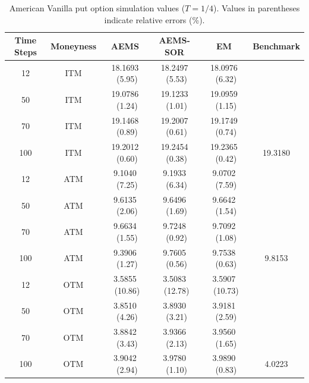 \documentclass[graybox]{svmult}
\begin{document}
\begin{table}[H]
\centering
\caption{American Vanilla put option simulation values ($T=1/4$). Values in parentheses indicate relative errors (\%).}
\label{tab:ThreeMonthsVanilla}
\setlength{\tabcolsep}{3.4pt} 
\begin{tabular}{c c c c c c}
\toprule
\textbf{Time Steps} & \textbf{Moneyness} & \textbf{AEMS} & \textbf{AEMS-SOR} & \textbf{EM} & \textbf{Benchmark} \\ 
\midrule
12  & ITM & 18.1693 \ (5.95) & 18.2497 \ (5.53) & 18.0976 \ (6.32) &  \\
50  & ITM & 19.0786 \ (1.24) & 19.1233 \ (1.01) & 19.0959 \ (1.15) \\
70  & ITM & 19.1468 \ (0.89) & 19.2007 \ (0.61) & 19.1749 \ (0.74) \\
100 & ITM & 19.2012 \ (0.60) & 19.2454 \ (0.38) & 19.2365 \ (0.42) & 19.3180 \\
\midrule
12  & ATM & \phantom{1}9.1040 \ (7.25) & \phantom{1}9.1933 \ (6.34) & \phantom{1}9.0702 \ (7.59) &  \\
50  & ATM & \phantom{1}9.6135 \ (2.06) & \phantom{1}9.6496 \ (1.69) & \phantom{1}9.6642 \ (1.54) \\
70  & ATM & \phantom{1}9.6634 \ (1.55) & \phantom{1}9.7248 \ (0.92) & \phantom{1}9.7092 \ (1.08) \\
100 & ATM & \phantom{1}9.3906 \ (1.27) & \phantom{1}9.7605 \ (0.56) & \phantom{1}9.7538 \ (0.63) & \phantom{1}9.8153 \\
\midrule
12  & OTM & \phantom{1}3.5855 \ (10.86) & \phantom{1}3.5083 \ (12.78) & \phantom{1}3.5907 \ (10.73) &  \\
50  & OTM & \phantom{1}3.8510 \ (4.26)  & \phantom{1}3.8930 \ (3.21)  & \phantom{1}3.9181 \ (2.59) \\
70  & OTM & \phantom{1}3.8842 \ (3.43)  & \phantom{1}3.9366 \ (2.13)  & \phantom{1}3.9560 \ (1.65) \\
100 & OTM & \phantom{1}3.9042 \ (2.94)  & \phantom{1}3.9780 \ (1.10)  & \phantom{1}3.9890 \ (0.83) & \phantom{1}4.0223 \\
\bottomrule
\end{tabular}
\end{table}
\end{document}
